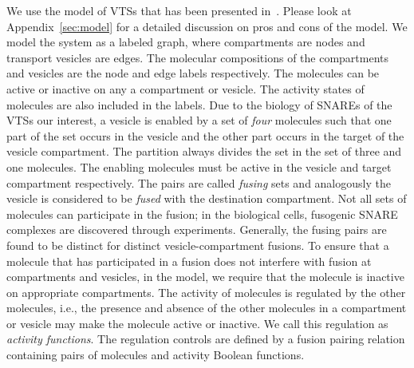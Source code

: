 We use the model of VTSs that has been presented
in~\cite{shukla2017discovering}.
%
Please look at Appendix~\ref{sec:model} for a detailed discussion on
pros and cons of the model.
%
We model the system as a labeled graph, where compartments are nodes
and transport vesicles are edges.
%
The molecular compositions of the compartments and vesicles are the
node and edge labels respectively.
%
The molecules can be active or inactive on any a compartment or
vesicle.
%
The activity states of molecules are also included in the labels.
%
Due to the biology of SNAREs of the VTSs our interest, a vesicle is enabled
by a set of {\em four} molecules such that one part of the set occurs in the
vesicle and the other part occurs in the target of the vesicle compartment.
%
The partition always divides the set in the set of three and one molecules.
%
%
%
%
%
The enabling molecules must be active in the vesicle
and target compartment respectively.
%
The pairs are called {\em fusing} sets and analogously
the vesicle is considered to be {\em fused} with the
destination compartment.
%
Not all sets of molecules can participate in the fusion; in the
biological cells, fusogenic SNARE complexes are discovered through
experiments.
%
%
Generally, the fusing pairs are found to be distinct for distinct vesicle-compartment fusions.
%
To ensure that a molecule that has participated in a fusion does not
interfere with fusion at compartments and vesicles, in the model, we
require that the molecule is inactive on appropriate compartments.
%
The activity of molecules is regulated by the other molecules, i.e.,
the presence and absence of the other molecules in a compartment or
vesicle may make the molecule active or inactive.
%
We call this regulation as {\em activity functions}.
%
%
%
%
The regulation controls are defined by a fusion pairing relation
containing pairs of molecules and activity
Boolean functions.

